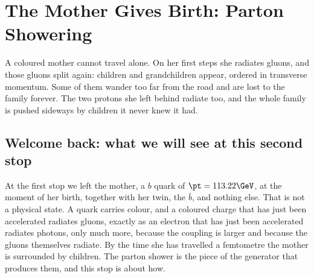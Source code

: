 \providecommand{\ptevol}{\ensuremath{p_{\mathrm{T,evol}}}\xspace}
\providecommand{\ptrad}{\ensuremath{p_{\mathrm{T,rad}}}\xspace}
\chapter{The Mother Gives Birth: Parton Showering}
\label{ch:mother_gives_birth}

\begin{journeybox}
A coloured mother cannot travel alone. On her first steps she radiates gluons,
and those gluons split again: children and grandchildren appear, ordered in
transverse momentum. Some of them wander too far from the road and are lost
to the family forever. The two protons she left behind radiate too, and the
whole family is pushed sideways by children it never knew it had.
\end{journeybox}


\section{Welcome back: what we will see at this second stop}
\label{sec:mother_gives_birth:what_we_compute}

At the first stop we left the mother, a $b$ quark of $\pt=113.22\GeV$, at the
moment of her birth, together with her twin, the $\bar b$, and nothing else.
That is not a physical state. A quark carries colour, and a coloured charge
that has just been accelerated radiates gluons, exactly as an electron that
has just been accelerated radiates photons, only much more, because the
coupling is larger and because the gluons themselves radiate. By the time she
has travelled a femtometre the mother is surrounded by children. The parton
shower is the piece of the generator that produces them, and this stop is
about how.

